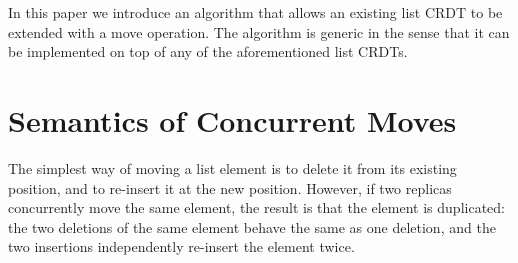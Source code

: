 \documentclass[sigplan,10pt]{acmart}
\begin{document}
In this paper we introduce an algorithm that allows an existing list CRDT to be extended with a move operation.
The algorithm is generic in the sense that it can be implemented on top of any of the aforementioned list CRDTs.

\section{Semantics of Concurrent Moves}\label{sec:semantics}

The simplest way of moving a list element is to delete it from its existing position, and to re-insert it at the new position.
However, if two replicas concurrently move the same element, the result is that the element is duplicated: the two deletions of the same element behave the same as one deletion, and the two insertions independently re-insert the element twice.

\end{document}
